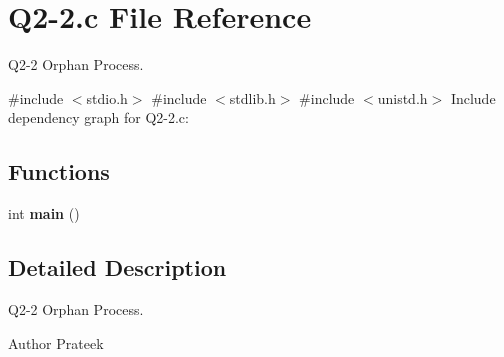 \hypertarget{Q2-2_8c}{}\section{Q2-\/2.c File Reference}
\label{Q2-2_8c}


Q2-\/2  Orphan Process.  


{\ttfamily \#include $<$stdio.\+h$>$}\newline
{\ttfamily \#include $<$stdlib.\+h$>$}\newline
{\ttfamily \#include $<$unistd.\+h$>$}\newline
Include dependency graph for Q2-\/2.c\+:
\subsection*{Functions}
\begin{DoxyCompactItemize}
\item 
\mbox{\label{Q2-2_8c_ae66f6b31b5ad750f1fe042a706a4e3d4}} 
int {\bfseries main} ()
\end{DoxyCompactItemize}


\subsection{Detailed Description}
Q2-\/2  Orphan Process. 

\begin{DoxyAuthor}{Author}
Prateek 
\end{DoxyAuthor}
